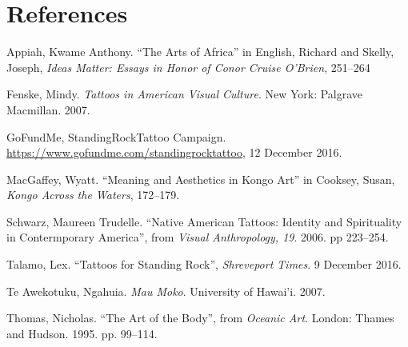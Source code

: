 \section*{References}

\bibent Appiah, Kwame Anthony. ``The Arts of Africa'' in English, Richard and
Skelly, Joseph, \textit{Ideas Matter: Essays in Honor of Conor Cruise O'Brien},
251--264

\bibent Fenske, Mindy. \textit{Tattoos in American Visual Culture}. New York:
Palgrave Macmillan. 2007.

\bibent GoFundMe, StandingRockTattoo Campaign.
\url{https://www.gofundme.com/standingrocktattoo}, 12 December 2016.

\bibent MacGaffey, Wyatt. ``Meaning and Aesthetics in Kongo Art'' in Cooksey,
Susan, \textit{Kongo Across the Waters}, 172--179.

\bibent Schwarz, Maureen Trudelle. ``Native American Tattoos: Identity and
Spirituality in Contermporary America'', from \textit{Visual Anthropology, 19}.
2006. pp 223--254.

\bibent Talamo, Lex. ``Tattoos for Standing Rock'', \textit{Shreveport Times}. 9
December 2016.

\bibent Te Awekotuku, Ngahuia. \textit{Mau Moko}. University of Hawai'i. 2007.

\bibent Thomas, Nicholas. ``The Art of the Body'', from \textit{Oceanic Art}.
London: Thames and Hudson. 1995. pp.  99--114.
